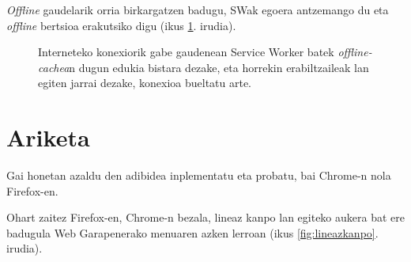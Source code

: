 \textit{Offline} gaudelarik orria birkargatzen badugu, SWak egoera antzemango du eta \textit{offline} bertsioa erakutsiko digu (ikus \ref{fig:serviceworker7}. irudia).

\begin{figure}[ht]
	\centering
{}
\caption{Interneteko konexiorik gabe gaudenean Service Worker batek \textit{offline-cachea}n dugun edukia bistara dezake, eta horrekin erabiltzaileak lan egiten jarrai dezake, konexioa bueltatu arte.}
\label{fig:serviceworker7}
\end{figure}

\section{Ariketa}
Gai honetan azaldu den adibidea inplementatu eta probatu, bai Chrome-n nola Firefox-en. 

Ohart zaitez Firefox-en, Chrome-n bezala, lineaz kanpo lan egiteko aukera bat ere badugula Web Garapenerako menuaren azken lerroan (ikus \ref{fig:lineazkanpo}. irudia).


